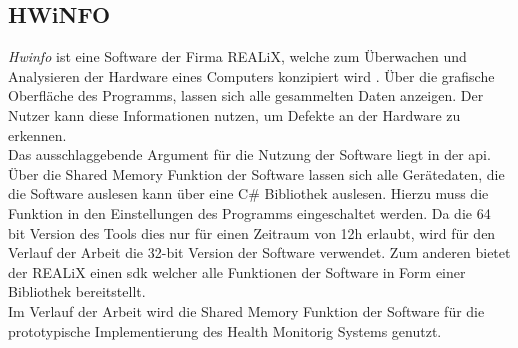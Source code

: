 \subsection{HWiNFO}\label{sec:HWiNFO}
\textit{Hwinfo} ist eine Software der Firma REALiX, welche zum Überwachen und Analysieren der Hardware eines Computers konzipiert wird \cite{HWINFO}. Über die grafische Oberfläche des Programms, lassen sich alle gesammelten Daten anzeigen. Der Nutzer kann diese Informationen nutzen, um Defekte an der Hardware zu erkennen.\\
Das ausschlaggebende Argument für die Nutzung der Software liegt in der \ac{api}. Über die Shared Memory Funktion der Software lassen sich alle Gerätedaten, die die Software auslesen kann über eine C\# Bibliothek auslesen. Hierzu muss die Funktion in den Einstellungen des Programms eingeschaltet werden. Da die 64 bit Version des Tools dies nur für einen Zeitraum von 12h erlaubt, wird für den Verlauf der Arbeit die 32-bit Version der Software verwendet. Zum anderen bietet der REALiX einen \ac{sdk} welcher alle Funktionen der Software in Form einer Bibliothek bereitstellt.\cite{HWINFO}\\
Im Verlauf der Arbeit wird die Shared Memory Funktion der Software für die prototypische Implementierung des Health Monitorig Systems genutzt.   